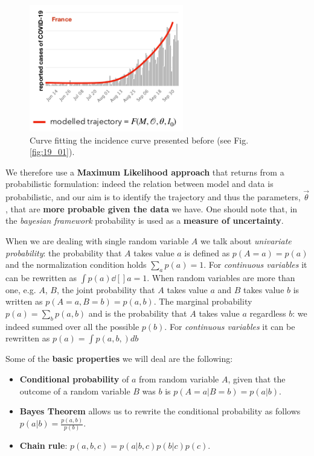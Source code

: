 \documentclass[../main/main.tex]{subfiles}
\begin{document}
\begin{figure}[h!]
\centering
\includegraphics[width=0.6\textwidth]{../lessons/image/19/image05.png}
\caption{\label{fig:19_05} Curve fitting the incidence curve presented before (see Fig. \ref{fig:19_01}). }
\end{figure}

We therefore use a \textbf{Maximum Likelihood approach} that returns from a probabilistic formulation: indeed the relation between model and data is probabilistic, and our aim is to  identify the trajectory and thus the parameters, $\vec{\theta}$, that are \textbf{more probable given the data} we have. One should note that, in the \textit{bayesian framework} probability is used as a \textbf{measure of uncertainty}.

When we are dealing with single random variable $A$ we talk about \textit{univariate probability}: the probability that $A$ takes value $a$ is defined as $p(A=a)=p(a)$ and the normalization condition holds $\sum_a p(a) = 1$. For \textit{continuous variables} it can be rewritten as  $\int p(a)\dd[]{a}= 1$. When random variables are more than one, e.g. $A$, $B$, the joint probability that $A$ takes value $a$ and $B$ takes value $b$ is written as $p(A=a,B=b) = p(a,b)$. The marginal probability $p(a) = \sum_b p(a,b)$ and is the probability that $A$ takes value $a$ regardless $b$: we indeed summed over all the possible $p(b)$.
For \textit{continuous variables} it can be rewritten as $p(a) = \int p(a,b,)db$

Some of the \textbf{basic properties} we will deal are the following:
\begin{itemize}
    \item \textbf{Conditional probability} of $a$ from random variable $A$, given that the outcome of a random variable $B$ was $b$ is $p(A=a|B=b) = p(a|b)$.
    \item \textbf{Bayes Theorem} allows us to rewrite the conditional probability as follows $p(a|b) = \frac{p(a,b)}{p(b)}$.
    \item \textbf{Chain rule}: $p(a,b,c) = p(a|b,c)p(b|c)p(c)$.
\end{itemize}
\end{document}
